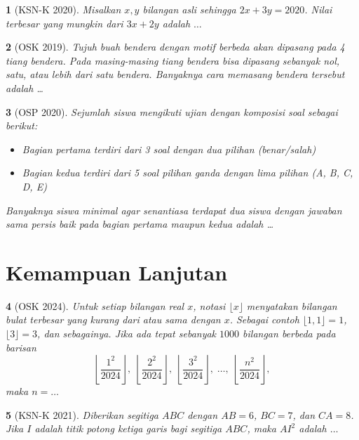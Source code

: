 \documentclass[11pt,a4paper,DIV=12]{scrartcl}
\theoremstyle{justnumber}
\newtheorem{problem}{}
\begin{document}
\begin{problem}[KSN-K 2020]
  Misalkan $x, y$ bilangan asli sehingga $2x + 3y = 2020$. Nilai terbesar yang mungkin dari $3x + 2y$ adalah $\ldots$
\end{problem}

\begin{problem}[OSK 2019]
  Tujuh buah bendera dengan motif berbeda akan dipasang pada 4 tiang bendera. Pada masing-masing tiang bendera bisa dipasang sebanyak nol, satu, atau lebih dari satu bendera. Banyaknya cara memasang bendera tersebut adalah \dots
\end{problem}

\begin{problem}[OSP 2020]
  Sejumlah siswa mengikuti ujian dengan komposisi soal sebagai berikut:
  \begin{itemize}
    \item Bagian pertama terdiri dari 3 soal dengan dua pilihan (benar/salah)
    \item Bagian kedua terdiri dari 5 soal pilihan ganda dengan lima pilihan (A, B, C, D, E)
  \end{itemize}
  Banyaknya siswa minimal agar senantiasa terdapat dua siswa dengan jawaban sama persis baik pada bagian pertama maupun kedua adalah \dots
\end{problem}

\section*{Kemampuan Lanjutan}
\begin{problem}[OSK 2024]
  Untuk setiap bilangan real $x$, notasi $\lfloor x \rfloor$ menyatakan bilangan bulat terbesar yang kurang dari atau sama dengan $x$. Sebagai contoh $\lfloor 1{,}1 \rfloor = 1$, $\lfloor 3 \rfloor = 3$, dan sebagainya. Jika ada tepat sebanyak $1000$ bilangan berbeda pada barisan
  \[
    \left\lfloor \frac{1^2}{2024} \right\rfloor,\;
    \left\lfloor \frac{2^2}{2024} \right\rfloor,\;
    \left\lfloor \frac{3^2}{2024} \right\rfloor,\;
    \ldots,\;
    \left\lfloor \frac{n^2}{2024} \right\rfloor,
  \]
  maka $n = \ldots$
\end{problem}

\begin{problem}[KSN-K 2021]
  Diberikan segitiga $ABC$ dengan $AB = 6$, $BC = 7$, dan $CA = 8$. Jika $I$ adalah titik potong ketiga garis bagi segitiga $ABC$, maka $AI^2$ adalah $\ldots$
\end{problem}
\end{document}
